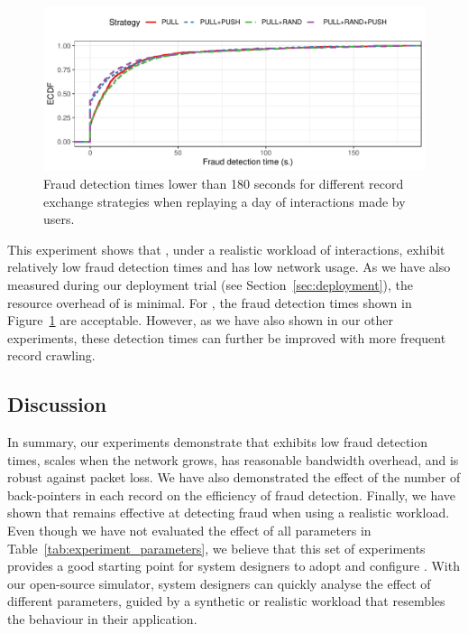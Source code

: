 \begin{figure}[t]
	\centering
	\includegraphics[width=\linewidth]{trustchain/assets/fraud_experiment_realistic_ecdf}
	\caption{Fraud detection times lower than 180 seconds for different record exchange strategies when replaying a day of interactions made by \Tribler{} users.}
	\label{fig:fraud_times_realistic_dataset}
\end{figure}

This experiment shows that \TrustChain{}, under a realistic workload of \Tribler{} interactions, exhibit relatively low fraud detection times and has low network usage.
As we have also measured during our deployment trial (see Section~\ref{sec:deployment}), the resource overhead of \TrustChain{} is minimal.
For \Tribler{}, the fraud detection times shown in Figure~\ref{fig:fraud_times_realistic_dataset} are acceptable.
However, as we have also shown in our other experiments, these detection times can further be improved with more frequent record crawling.

\subsection{Discussion}
In summary, our experiments demonstrate that \TrustChain{} exhibits low fraud detection times, scales when the network grows, has reasonable bandwidth overhead, and is robust against packet loss.
We have also demonstrated the effect of the number of back-pointers in each record on the efficiency of fraud detection.
Finally, we have shown that \TrustChain{} remains effective at detecting fraud when using a realistic workload.
Even though we have not evaluated the effect of all parameters in Table~\ref{tab:experiment_parameters}, we believe that this set of experiments provides a good starting point for system designers to adopt and configure \TrustChain{}.
With our open-source simulator, system designers can quickly analyse the effect of different parameters, guided by a synthetic or realistic workload that resembles the behaviour in their application.

